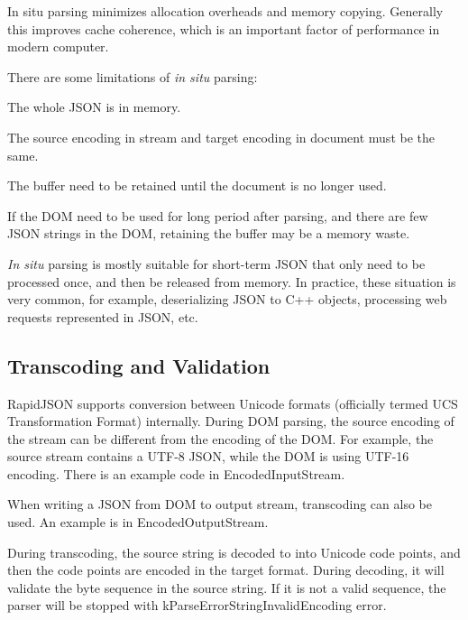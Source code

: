 In situ parsing minimizes allocation overheads and memory copying. Generally this improves cache coherence, which is an important factor of performance in modern computer.

There are some limitations of {\itshape in situ} parsing\+:


\begin{DoxyEnumerate}
\item The whole J\+S\+ON is in memory.
\item The source encoding in stream and target encoding in document must be the same.
\item The buffer need to be retained until the document is no longer used.
\item If the D\+OM need to be used for long period after parsing, and there are few J\+S\+ON strings in the D\+OM, retaining the buffer may be a memory waste.
\end{DoxyEnumerate}

{\itshape In situ} parsing is mostly suitable for short-\/term J\+S\+ON that only need to be processed once, and then be released from memory. In practice, these situation is very common, for example, deserializing J\+S\+ON to C++ objects, processing web requests represented in J\+S\+ON, etc.\hypertarget{md_Commun_Externe_RapidJSON_doc_dom.zh-cn_TranscodingAndValidation}{}\subsection{Transcoding and Validation}\label{md_Commun_Externe_RapidJSON_doc_dom.zh-cn_TranscodingAndValidation}
Rapid\+J\+S\+ON supports conversion between Unicode formats (officially termed U\+CS Transformation Format) internally. During D\+OM parsing, the source encoding of the stream can be different from the encoding of the D\+OM. For example, the source stream contains a U\+T\+F-\/8 J\+S\+ON, while the D\+OM is using U\+T\+F-\/16 encoding. There is an example code in Encoded\+Input\+Stream.

When writing a J\+S\+ON from D\+OM to output stream, transcoding can also be used. An example is in Encoded\+Output\+Stream.

During transcoding, the source string is decoded to into Unicode code points, and then the code points are encoded in the target format. During decoding, it will validate the byte sequence in the source string. If it is not a valid sequence, the parser will be stopped with {\ttfamily k\+Parse\+Error\+String\+Invalid\+Encoding} error.

